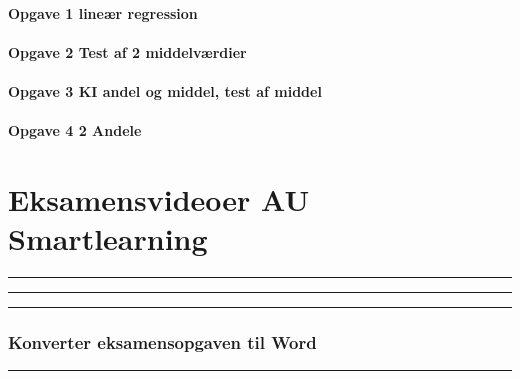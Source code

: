 \documentclass[]{book}
\let\oldparagraph\paragraph
\renewcommand{\paragraph}[1]{\oldparagraph{#1}\mbox{}}
\begin{document}
\hypertarget{opgave-1-liner-regression-1}{%
\paragraph{Opgave 1 lineær
regression}\label{opgave-1-liner-regression-1}}

\hypertarget{opgave-2-test-af-2-middelvrdier}{%
\paragraph{Opgave 2 Test af 2
middelværdier}\label{opgave-2-test-af-2-middelvrdier}}

\hypertarget{opgave-3-ki-andel-og-middel-test-af-middel}{%
\paragraph{Opgave 3 KI andel og middel, test af
middel}\label{opgave-3-ki-andel-og-middel-test-af-middel}}

\hypertarget{opgave-4-2-andele}{%
\paragraph{Opgave 4 2 Andele}\label{opgave-4-2-andele}}

\hypertarget{eksamensvideoer-au-smartlearning}{%
\section{Eksamensvideoer AU
Smartlearning}\label{eksamensvideoer-au-smartlearning}}

\begin{center}\rule{0.5\linewidth}{\linethickness}\end{center}

\begin{center}\rule{0.5\linewidth}{\linethickness}\end{center}

\begin{center}\rule{0.5\linewidth}{\linethickness}\end{center}

\hypertarget{konverter-eksamensopgaven-til-word}{%
\subsubsection{Konverter eksamensopgaven til
Word}\label{konverter-eksamensopgaven-til-word}}

\begin{center}\rule{0.5\linewidth}{\linethickness}\end{center}
\end{document}
